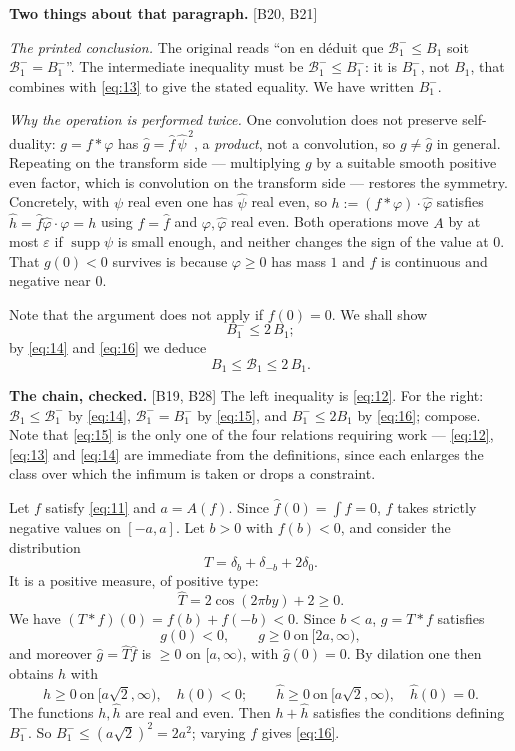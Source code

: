 \documentclass[11pt,reqno]{amsart}
\theoremstyle{plain}
\theoremstyle{definition}
\theoremstyle{remark}
\newcommand{\Bcal}{\mathcal{B}}
\newcommand{\fh}{\widehat{f}}
\DeclareMathOperator{\supp}{supp}
\newcommand{\Ledger}[1]{{\scriptsize\textsf{[#1]}}}
\begin{document}
\begin{expansion}
\textbf{Two things about that paragraph.} \Ledger{B20, B21}

\emph{The printed conclusion.} The original reads ``on en d\'eduit que
$\Bcal_1^-\le B_1$ soit $\Bcal_1^-=B_1^-$''. The intermediate inequality must be
$\Bcal_1^-\le B_1^-$: it is $B_1^-$, not $B_1$, that combines with \eqref{eq:13} to
give the stated equality. We have written $B_1^-$.

\emph{Why the operation is performed twice.} One convolution does not preserve
self-duality: $g=f*\varphi$ has $\widehat g=\fh\,\widehat\psi^{\,2}$, a
\emph{product}, not a convolution, so $g\ne\widehat g$ in general. Repeating on the
transform side --- multiplying $g$ by a suitable smooth positive even factor, which is
convolution on the transform side --- restores the symmetry. Concretely, with
$\psi$ real even one has $\widehat\psi$ real even, so
$h:=(f*\varphi)\cdot\widehat\varphi$ satisfies $\widehat h=\fh\widehat\varphi\cdot
\varphi=h$ using $f=\fh$ and $\varphi,\widehat\varphi$ real even. Both operations
move $A$ by at most $\varepsilon$ if $\supp\psi$ is small enough, and neither changes
the sign of the value at $0$. That $g(0)<0$ survives is because $\varphi\ge0$ has mass
$1$ and $f$ is continuous and negative near $0$.
\end{expansion}

Note that the argument does not apply if $f(0)=0$. We shall show
\begin{equation}\label{eq:16}
 B_1^-\le2\,B_1 ;
\end{equation}
by \eqref{eq:14} and \eqref{eq:16} we deduce
\begin{equation}\label{eq:17}
 B_1\le\Bcal_1\le2\,B_1 .
\end{equation}

\begin{expansion}
\textbf{The chain, checked.} \Ledger{B19, B28} The left inequality is \eqref{eq:12}.
For the right: $\Bcal_1\le\Bcal_1^-$ by \eqref{eq:14}, $\Bcal_1^-=B_1^-$ by
\eqref{eq:15}, and $B_1^-\le2B_1$ by \eqref{eq:16}; compose. Note that
\eqref{eq:15} is the only one of the four relations requiring work --- \eqref{eq:12},
\eqref{eq:13} and \eqref{eq:14} are immediate from the definitions, since each
enlarges the class over which the infimum is taken or drops a constraint.
\end{expansion}

Let $f$ satisfy \eqref{eq:11} and $a=A(f)$. Since $\fh(0)=\int f=0$, $f$ takes
strictly negative values on $[-a,a]$. Let $b>0$ with $f(b)<0$, and consider the
distribution
\[T=\delta_b+\delta_{-b}+2\delta_0 .\]
It is a positive measure, of positive type:
\[\widehat T=2\cos(2\pi by)+2\ge0 .\]
We have $(T*f)(0)=f(b)+f(-b)<0$. Since $b<a$, $g=T*f$ satisfies
\[g(0)<0,\qquad g\ge0\ \text{on}\ [2a,\infty),\]
and moreover $\widehat g=\widehat T\fh$ is $\ge0$ on $[a,\infty)$, with $\widehat
g(0)=0$. By dilation one then obtains $h$ with
\[h\ge0\ \text{on}\ [a\sqrt2,\infty),\quad h(0)<0;\qquad
  \widehat h\ge0\ \text{on}\ [a\sqrt2,\infty),\quad \widehat h(0)=0 .\]
The functions $h,\widehat h$ are real and even. Then $h+\widehat h$ satisfies the
conditions defining $B_1^-$. So $B_1^-\le(a\sqrt2)^2=2a^2$; varying $f$ gives
\eqref{eq:16}.
\end{document}
